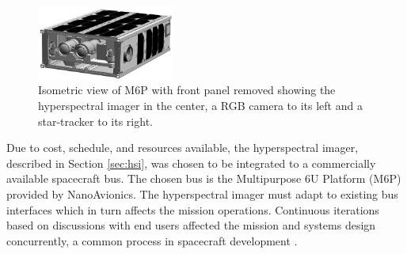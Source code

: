 \begin{figure}[htbp]
  \centering
      \includegraphics[width=0.4\textwidth]{figs/M6P.png}
  \caption{Isometric view of M6P with front panel removed showing the hyperspectral imager in the center, a RGB camera to its left and a star-tracker to its right.}
\end{figure}
Due to cost, schedule, and resources available, the hyperspectral imager, described in Section \ref{sec:hsi}, was chosen to be integrated to a commercially available spacecraft bus. The chosen bus is the Multipurpose 6U Platform (M6P) provided by NanoAvionics. The hyperspectral imager must adapt to existing bus interfaces which in turn affects the mission operations. Continuous iterations based on discussions with end users affected the mission and systems design concurrently, a common process in spacecraft development \cite{Ryschkewitsch2009,boehm1988,smad1999}. 

